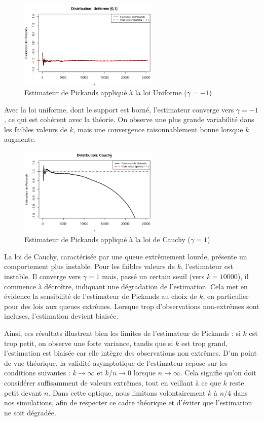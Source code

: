 \documentclass{article}
\theoremstyle{plain}
\theoremstyle{definition}
\theoremstyle{plain}
\begin{document}
\begin{figure}[H]
    \centering
    \includegraphics[width=0.6\textwidth]{./image_hill_pickands/uniforme_pickands.png}
    \caption{Estimateur de Pickands appliqué à la loi Uniforme ($\gamma = -1$)}
\end{figure}
Avec la loi uniforme, dont le support est borné, l’estimateur converge vers $\gamma = -1$, ce qui est cohérent avec la théorie. On observe une plus grande variabilité dans les faibles valeurs de $k$, mais une convergence raisonnablement bonne lorsque $k$ augmente.


\begin{figure}[H]
    \centering
    \includegraphics[width=0.6\textwidth]{./image_hill_pickands/cauchy_pickands.png}
    \caption{Estimateur de Pickands appliqué à la loi de Cauchy ($\gamma = 1$)}
\end{figure}
La loi de Cauchy, caractérisée par une queue extrêmement lourde, présente un comportement plus instable. Pour les faibles valeurs de $k$, l’estimateur est instable. Il converge vers $\gamma = 1$ mais, passé un certain seuil (vers $k = 10000$), il commence à décroître, indiquant une dégradation de l’estimation. Cela met en évidence la sensibilité de l’estimateur de Pickands au choix de $k$, en particulier pour des lois aux queues extrêmes. Lorsque trop d'observations non-extrêmes sont incluses, l’estimation devient biaisée.

Ainsi, ces résultats illustrent bien les limites de l’estimateur de Pickands : si \(k\) est trop petit, on observe une forte variance, tandis que si \(k\) est trop grand, l’estimation est biaisée car elle intègre des observations non extrêmes. D’un point de vue théorique, la validité asymptotique de l’estimateur repose sur les conditions suivantes : \(k \to \infty\) et \(k/n \to 0\) lorsque \(n \to \infty\). Cela signifie qu’on doit considérer suffisamment de valeurs extrêmes, tout en veillant à ce que \(k\) reste petit devant \(n\). Dans cette optique, nous limitons volontairement \(k\) à \(n/4\) dans nos simulations, afin de respecter ce cadre théorique et d’éviter que l’estimation ne soit dégradée.
\end{document}
